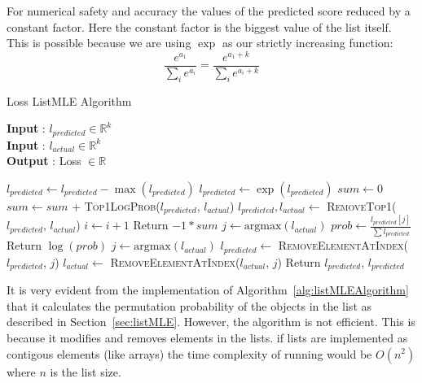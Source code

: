 \documentclass[12pt, twoside, ngerman]{report}
\begin{document}
For numerical safety and accuracy the values of the predicted score reduced by a constant factor.  Here the constant factor is the biggest value of the list itself.
This is possible because we are using $\exp$ as our strictly increasing function:
$$
\frac{e^{a_1}}{\sum\limits_{i} e^{a_i}} = \frac{e^{a_1 + k}}{\sum\limits_{i} e^{a_i + k}} 
$$

\begin{algorithm}[h]
\caption{Loss ListMLE Algorithm}
\label{alg:listMLEAlgorithm}
\hspace*{\algorithmicindent} \textbf{Input} : $l_{predicted} \in \mathbb{R}^k$ \\
\hspace*{\algorithmicindent} \textbf{Input} : $l_{actual} \in \mathbb{R}^k$ \\
\hspace*{\algorithmicindent} \textbf{Output} : Loss $\in \mathbb{R}$
\begin{algorithmic}[1]
    \State $l_{predicted} \gets l_{predicted} - \max(l_{predicted})$
    \State $l_{predicted} \gets \exp(l_{predicted})$
    \State $sum \gets 0$
     
        \State $sum \gets sum$ + \textsc{Top1LogProb}($l_{predicted}$,  $l_{actual}$)
        \State $l_{predicted},  l_{actual} \gets $ \textsc{RemoveTop1}($l_{predicted}$,  $l_{actual}$)
        \State $i \gets i + 1$
    \EndFor
    \State  Return $-1 * sum$
    \EndProcedure
    \State $j \gets \textrm{argmax}(l_{actual})$
    \State $prob \gets \frac{l_{predicted}[j]}{\sum l_{predicted} }$
    \State  Return $\log(prob)$
    \EndProcedure
    \State $j \gets \textrm{argmax}(l_{actual})$
    \State $l_{predicted} \gets$ \textsc{RemoveElementAtIndex}($l_{predicted}$, $j$)
    \State $l_{actual} \gets$ \textsc{RemoveElementAtIndex}($l_{actual}$, $j$)
    \State  Return $l_{predicted}$,  $l_{predicted}$
    \EndProcedure
\end{algorithmic}
\end{algorithm}

It is very evident from the implementation of Algorithm~\ref{alg:listMLEAlgorithm} that it calculates the permutation probability of the objects in the list as described in Section~\ref{sec:listMLE}.
However,  the algorithm is not efficient.
This is because it modifies and removes elements in the lists.
if lists are implemented as contigous elements (like arrays) the time complexity of running would be $O(n^2)$ where $n$ is the list size.
\end{document}
